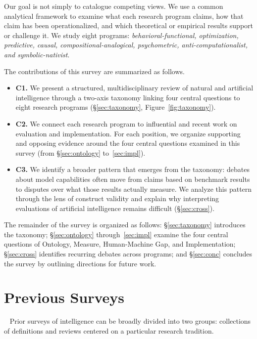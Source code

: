 \documentclass[acmsmall,screen,review,anonymous]{acmart}
\begin{document}
Our goal is not simply to catalogue competing views.
%
We use a common analytical framework to examine what each research program claims, how that claim has been operationalized, and which theoretical or empirical results support or challenge it.
%
We study eight programs: \textit{behavioral-functional, optimization, predictive, causal, compositional-analogical, psychometric, anti-computationalist, and symbolic-nativist}.


The contributions of this survey are summarized as follows.
\begin{itemize}
\item \textbf{C1.} We present a structured, multidisciplinary review of natural and artificial intelligence through a two-axis taxonomy linking four central questions to eight research programs (\S\ref{sec:taxonomy}, Figure~\ref{fig:taxonomy}).
\item \textbf{C2.} We connect each research program to influential and recent work on evaluation and implementation.
%
For each position, we organize supporting and opposing evidence around the four central questions examined in this survey (from \S\ref{sec:ontology} to~\ref{sec:impl}).
\item \textbf{C3.} We identify a broader pattern that emerges from the taxonomy: debates about model capabilities often move from claims based on benchmark results to disputes over what those results actually measure.
%
We analyze this pattern through the lens of construct validity and explain why interpreting evaluations of artificial intelligence remains difficult (\S\ref{sec:cross}).
\end{itemize}


The remainder of the survey is organized as follows: \S\ref{sec:taxonomy} introduces the taxonomy; \S\ref{sec:ontology} through~\ref{sec:impl} examine the four central questions of Ontology, Measure, Human-Machine Gap, and Implementation; \S\ref{sec:cross} identifies recurring debates across programs; and \S\ref{sec:conc} concludes the survey by outlining directions for future work.



\section{Previous Surveys}~\label{sec:previous}
Prior surveys of intelligence can be broadly divided into two groups: collections of definitions and reviews centered on a particular research tradition. 
\end{document}

